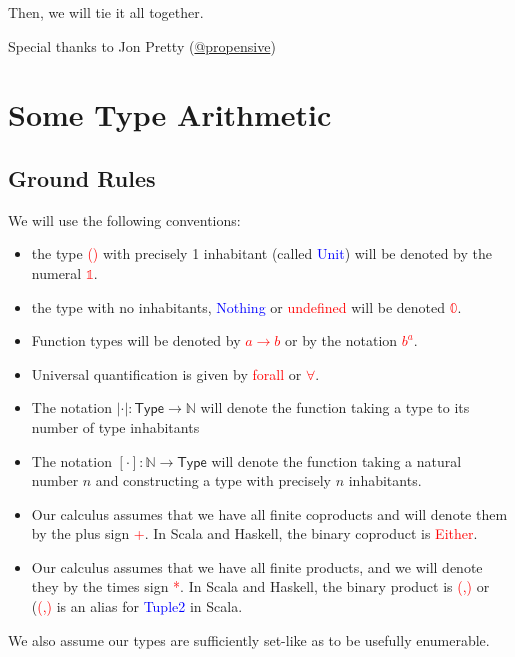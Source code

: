 \documentclass[tikz]{beamer}
\newcommand{\cat}[1]{\bm{ \mathsf{#1} }}
\newcommand{\zero}{\bm{\mathbb{0}}}
\newcommand{\one}{\bm{\mathbb{1}}}
\newcommand{\red}[1]{\textcolor{red}{#1}}
\newcommand{\mred}[1]{\textcolor{red}{$#1$}}
\newcommand{\blue}[1]{\textcolor{blue}{#1}}
\theoremstyle{definition}
\begin{document}
\frame
{ 
	Then, we will tie it all together. 
}

\frame
{ 
	Special thanks to Jon Pretty (\href{https://twitter.com/propensive}{@propensive})
}

\section{Some Type Arithmetic}

\subsection{Ground Rules}


\frame
{ 
	We will use the following conventions: 
	
	\begin{itemize}
		\item the type \red{()} with precisely 1 inhabitant (called \blue{Unit}) will be denoted by the numeral  \mred{\one}. 
		\item the type with no inhabitants, \blue{Nothing} or \red{undefined} will be denoted \mred{\zero}. 
		\item Function types will be denoted by \red{$a \to b$} or by the notation \red{$b^a$}. 
		\item Universal quantification is given by \red{forall} or \red{$\forall$}.
		\item The notation $|\cdot| : \cat{Type} \to \mathbb{N}$ will denote the function taking a type to its number of type inhabitants
		\item The notation $[\cdot] : \mathbb{N} \to \cat{Type} $ will denote the function taking a natural number $n$ and constructing a type with precisely $n$ inhabitants. 
	\end{itemize}
}

\frame
{
	\begin{itemize}
		\item Our calculus assumes that we have all finite coproducts and will denote them by the plus sign \red{+}. In Scala and Haskell, the binary coproduct is \red{Either}.
		\item Our calculus assumes that we have all finite products, and we will denote they by the times sign \red{*}. In Scala and Haskell, the binary product is \red{(,)} or (\red{(,)} is an alias for \blue{Tuple2} in Scala.
	\end{itemize}
}


\frame
{
	We also assume our types are sufficiently set-like as to be usefully enumerable. 
}
\end{document}
